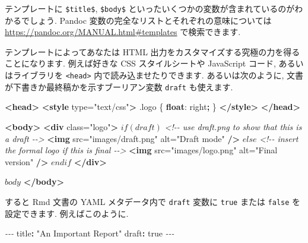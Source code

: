 \documentclass[
  11pt,
  lualatex,
  ja=standard]{bxjsreport}
\newenvironment{Shaded}{\begin{snugshade}}{\end{snugshade}}
\newcommand{\AttributeTok}[1]{\textcolor[rgb]{0.77,0.63,0.00}{#1}}
\newcommand{\CharTok}[1]{\textcolor[rgb]{0.31,0.60,0.02}{#1}}
\newcommand{\CommentTok}[1]{\textcolor[rgb]{0.56,0.35,0.01}{\textit{#1}}}
\newcommand{\DecValTok}[1]{\textcolor[rgb]{0.00,0.00,0.81}{#1}}
\newcommand{\FunctionTok}[1]{\textcolor[rgb]{0.00,0.00,0.00}{#1}}
\newcommand{\KeywordTok}[1]{\textcolor[rgb]{0.13,0.29,0.53}{\textbf{#1}}}
\newcommand{\NormalTok}[1]{#1}
\newcommand{\OperatorTok}[1]{\textcolor[rgb]{0.81,0.36,0.00}{\textbf{#1}}}
\newcommand{\OtherTok}[1]{\textcolor[rgb]{0.56,0.35,0.01}{#1}}
\newcommand{\PreprocessorTok}[1]{\textcolor[rgb]{0.56,0.35,0.01}{\textit{#1}}}
\newcommand{\StringTok}[1]{\textcolor[rgb]{0.31,0.60,0.02}{#1}}
\begin{document}
テンプレートに \texttt{\$title\$}, \texttt{\$body\$} といったいくつかの変数が含まれているのがわかるでしょう. Pandoc 変数の完全なリストとそれぞれの意味については \url{https://pandoc.org/MANUAL.html\#templates} で検索できます.

テンプレートによってあなたは HTML 出力をカスタマイズする究極の力を得ることになります. 例えば好きな CSS スタイルシートや JavaScript コード, あるいはライブラリを \texttt{\textless{}head\textgreater{}} 内で読み込ませたりできます. あるいは次のように, 文書が下書きか最終稿かを示すブーリアン変数 \texttt{draft} も使えます.

\begin{Shaded}
\begin{Highlighting}[]
\KeywordTok{\textless{}head\textgreater{}}
\KeywordTok{\textless{}style}\OtherTok{ type=}\StringTok{"text/css"}\KeywordTok{\textgreater{}}
\FunctionTok{.logo}\NormalTok{ \{}
  \KeywordTok{float}\NormalTok{: }\DecValTok{right}\OperatorTok{;}
\NormalTok{\}}
\KeywordTok{\textless{}/style\textgreater{}}
\KeywordTok{\textless{}/head\textgreater{}}

\KeywordTok{\textless{}body\textgreater{}}
\KeywordTok{\textless{}div}\OtherTok{ class=}\StringTok{"logo"}\KeywordTok{\textgreater{}}
\NormalTok{$if(draft)$}
\CommentTok{\textless{}!{-}{-} use draft.png to show that this is a draft {-}{-}\textgreater{}}
\KeywordTok{\textless{}img}\OtherTok{ src=}\StringTok{"images/draft.png"}\OtherTok{ alt=}\StringTok{"Draft mode"} \KeywordTok{/\textgreater{}}
\NormalTok{$else$}
\CommentTok{\textless{}!{-}{-} insert the formal logo if this is final {-}{-}\textgreater{}}
\KeywordTok{\textless{}img}\OtherTok{ src=}\StringTok{"images/logo.png"}\OtherTok{ alt=}\StringTok{"Final version"} \KeywordTok{/\textgreater{}}
\NormalTok{$endif$}
\KeywordTok{\textless{}/div\textgreater{}}

\NormalTok{$body$}
\KeywordTok{\textless{}/body\textgreater{}}
\end{Highlighting}
\end{Shaded}

すると Rmd 文書の YAML メタデータ内で \texttt{draft} 変数に \texttt{true} または \texttt{false} を設定できます. 例えばこのように.

\begin{Shaded}
\begin{Highlighting}[]
\PreprocessorTok{{-}{-}{-}}
\FunctionTok{title}\KeywordTok{:}\AttributeTok{ }\StringTok{"An Important Report"}
\FunctionTok{draft}\KeywordTok{:}\AttributeTok{ }\CharTok{true}
\PreprocessorTok{{-}{-}{-}}
\end{Highlighting}
\end{Shaded}
\end{document}
